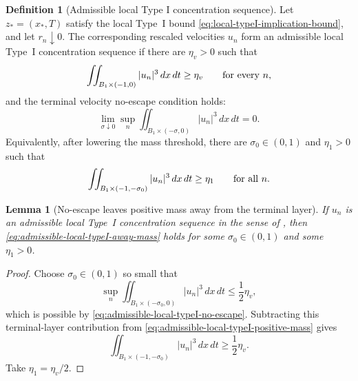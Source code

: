 \documentclass[11pt]{amsart}
\numberwithin{equation}{section}
\theoremstyle{plain}
\newtheorem{lemma}[lemma]{Lemma}
\theoremstyle{definition}
\newtheorem{definition}[definition]{Definition}
\theoremstyle{remark}
\begin{document}
\begin{definition}[Admissible local Type I concentration sequence]
\label{def:admissible-local-typeI-sequence}
Let \(z_*=(x_*,T)\) satisfy the local Type~I bound
\eqref{eq:local-typeI-implication-bound}, and let \(r_n\downarrow0\).  The
corresponding rescaled velocities \(u_n\) form an admissible local Type~I
concentration sequence if there are \(\eta_v>0\) such that
\begin{equation}\label{eq:admissible-local-typeI-positive-mass}
   \iint_{B_1\times(-1,0)} |u_n|^3\,dx\,dt\ge\eta_v
   \qquad\hbox{for every }n,
\end{equation}
and the terminal velocity no-escape condition holds:
\begin{equation}\label{eq:admissible-local-typeI-no-escape}
   \lim_{\sigma\downarrow0}
   \sup_n
   \iint_{B_1\times(-\sigma,0)} |u_n|^3\,dx\,dt=0 .
\end{equation}
Equivalently, after lowering the mass threshold, there are
\(\sigma_0\in(0,1)\) and \(\eta_1>0\) such that
\begin{equation}\label{eq:admissible-local-typeI-away-mass}
   \iint_{B_1\times(-1,-\sigma_0)} |u_n|^3\,dx\,dt\ge\eta_1
   \qquad\hbox{for all }n .
\end{equation}
\end{definition}

\begin{lemma}[No-escape leaves positive mass away from the terminal layer]
\label{lem:local-no-escape-away-mass}
If \(u_n\) is an admissible local Type~I concentration sequence in the sense of
, then
\eqref{eq:admissible-local-typeI-away-mass} holds for some
\(\sigma_0\in(0,1)\) and some \(\eta_1>0\).
\end{lemma}

\begin{proof}
Choose \(\sigma_0\in(0,1)\) so small that
\[
   \sup_n
   \iint_{B_1\times(-\sigma_0,0)} |u_n|^3\,dx\,dt
   \le \frac12\eta_v ,
\]
which is possible by \eqref{eq:admissible-local-typeI-no-escape}.  Subtracting
this terminal-layer contribution from
\eqref{eq:admissible-local-typeI-positive-mass} gives
\[
   \iint_{B_1\times(-1,-\sigma_0)} |u_n|^3\,dx\,dt
   \ge \frac12\eta_v .
\]
Take \(\eta_1=\eta_v/2\).
\end{proof}
\end{document}
